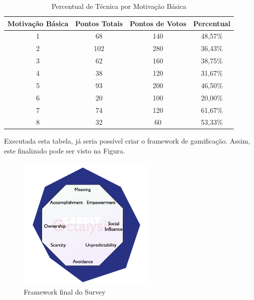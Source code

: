 \begin{table}[]
\centering
\caption{Percentual de Técnica por Motivação Básica}
\label{tab:percentual_tecnica_motivacao}
\begin{tabular}{@{}cccc@{}}
\toprule
Motivação Básica & Pontos Totais & Pontos de Votos & Percentual \\ \midrule
1         & 68            & 140             & 48,57\%    \\
2         & 102           & 280             & 36,43\%    \\
3         & 62            & 160             & 38,75\%    \\
4         & 38            & 120             & 31,67\%    \\
5         & 93            & 200             & 46,50\%    \\
6         & 20            & 100             & 20,00\%    \\
7         & 74            & 120             & 61,67\%    \\
8         & 32            & 60              & 53,33\%    \\ \bottomrule
\end{tabular}
\end{table}

Executada esta tabela, já seria possível criar o framework de gamificação. Assim,
este finalizado pode ser visto na Figura.

\begin{figure}[h]
    \centering

    \includegraphics[width=250px, scale=1]{figuras/final_survey}
    \caption{Framework final do Survey}

    \label{fig:final_framework_octalisys}
\end{figure}

